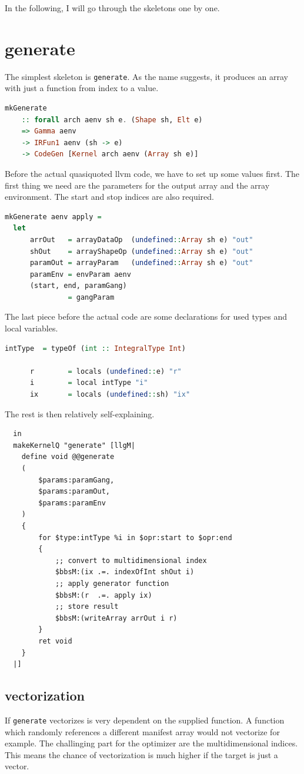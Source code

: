 \documentclass[a4paper,bibliography=totocnumbered,parskip,headsepline]{scrbook}
\begin{document}
In the following, I will go through the skeletons one by one.
\section{generate}
The simplest skeleton is \lstinline[language=haskell]!generate!.
As the name suggests, it produces an array with just a function from index to a value.
\begin{lstlisting}[language=haskell]
mkGenerate
    :: forall arch aenv sh e. (Shape sh, Elt e)
    => Gamma aenv
    -> IRFun1 aenv (sh -> e)
    -> CodeGen [Kernel arch aenv (Array sh e)]
\end{lstlisting}
Before the actual quasiquoted llvm code, we have to set up some values first.
The first thing we need are the parameters for the output array and the array environment.
The start and stop indices are also required.
\begin{lstlisting}[language=haskell]
mkGenerate aenv apply =
  let
      arrOut   = arrayDataOp  (undefined::Array sh e) "out"
      shOut    = arrayShapeOp (undefined::Array sh e) "out"
      paramOut = arrayParam   (undefined::Array sh e) "out"
      paramEnv = envParam aenv
      (start, end, paramGang)
               = gangParam
\end{lstlisting}
The last piece before the actual code are some declarations for used types and local variables.
\begin{lstlisting}[language=haskell]
      intType  = typeOf (int :: IntegralType Int)

      r        = locals (undefined::e) "r"
      i        = local intType "i"
      ix       = locals (undefined::sh) "ix"
\end{lstlisting}
The rest is then relatively self-explaining.
\begin{lstlisting}
  in
  makeKernelQ "generate" [llgM|
    define void @@generate
    (
        $params:paramGang,
        $params:paramOut,
        $params:paramEnv
    )
    {
        for $type:intType %i in $opr:start to $opr:end
        {
            ;; convert to multidimensional index
            $bbsM:(ix .=. indexOfInt shOut i)
            ;; apply generator function
            $bbsM:(r  .=. apply ix)
            ;; store result
            $bbsM:(writeArray arrOut i r)
        }
        ret void
    }
  |]
\end{lstlisting}
\subsection{vectorization}
If \lstinline[language=haskell]!generate! vectorizes is very dependent on the supplied function.
A function which randomly references a different manifest array would not vectorize for example.
The challinging part for the optimizer are the multidimensional indices.
This means the chance of vectorization is much higher if the target is just a vector.
\end{document}
